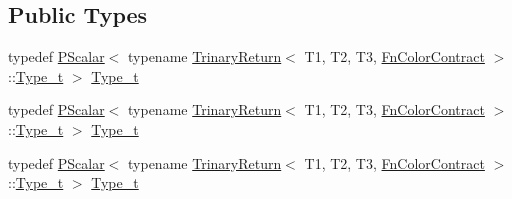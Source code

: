 \subsection*{Public Types}
\begin{DoxyCompactItemize}
\item 
typedef \mbox{\hyperlink{classENSEM_1_1PScalar}{P\+Scalar}}$<$ typename \mbox{\hyperlink{structENSEM_1_1TrinaryReturn}{Trinary\+Return}}$<$ T1, T2, T3, \mbox{\hyperlink{structENSEM_1_1FnColorContract}{Fn\+Color\+Contract}} $>$\+::\mbox{\hyperlink{structENSEM_1_1TrinaryReturn_3_01PColorVector_3_01T1_00_01N_01_4_00_01PColorVector_3_01T2_00_01N4ce572db3e48fe7214a7d25b458894fc_a5776e82d03d9b207eec13d0bb0a9b447}{Type\+\_\+t}} $>$ \mbox{\hyperlink{structENSEM_1_1TrinaryReturn_3_01PColorVector_3_01T1_00_01N_01_4_00_01PColorVector_3_01T2_00_01N4ce572db3e48fe7214a7d25b458894fc_a5776e82d03d9b207eec13d0bb0a9b447}{Type\+\_\+t}}
\item 
typedef \mbox{\hyperlink{classENSEM_1_1PScalar}{P\+Scalar}}$<$ typename \mbox{\hyperlink{structENSEM_1_1TrinaryReturn}{Trinary\+Return}}$<$ T1, T2, T3, \mbox{\hyperlink{structENSEM_1_1FnColorContract}{Fn\+Color\+Contract}} $>$\+::\mbox{\hyperlink{structENSEM_1_1TrinaryReturn_3_01PColorVector_3_01T1_00_01N_01_4_00_01PColorVector_3_01T2_00_01N4ce572db3e48fe7214a7d25b458894fc_a5776e82d03d9b207eec13d0bb0a9b447}{Type\+\_\+t}} $>$ \mbox{\hyperlink{structENSEM_1_1TrinaryReturn_3_01PColorVector_3_01T1_00_01N_01_4_00_01PColorVector_3_01T2_00_01N4ce572db3e48fe7214a7d25b458894fc_a5776e82d03d9b207eec13d0bb0a9b447}{Type\+\_\+t}}
\item 
typedef \mbox{\hyperlink{classENSEM_1_1PScalar}{P\+Scalar}}$<$ typename \mbox{\hyperlink{structENSEM_1_1TrinaryReturn}{Trinary\+Return}}$<$ T1, T2, T3, \mbox{\hyperlink{structENSEM_1_1FnColorContract}{Fn\+Color\+Contract}} $>$\+::\mbox{\hyperlink{structENSEM_1_1TrinaryReturn_3_01PColorVector_3_01T1_00_01N_01_4_00_01PColorVector_3_01T2_00_01N4ce572db3e48fe7214a7d25b458894fc_a5776e82d03d9b207eec13d0bb0a9b447}{Type\+\_\+t}} $>$ \mbox{\hyperlink{structENSEM_1_1TrinaryReturn_3_01PColorVector_3_01T1_00_01N_01_4_00_01PColorVector_3_01T2_00_01N4ce572db3e48fe7214a7d25b458894fc_a5776e82d03d9b207eec13d0bb0a9b447}{Type\+\_\+t}}
\end{DoxyCompactItemize}


